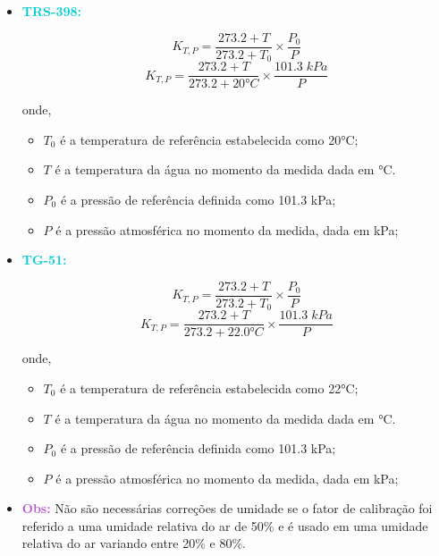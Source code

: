 \documentclass[11pt,a4paper]{article}
\newcounter{exemplo}
\begin{document}
	\begin{exemplo}
		\begin{itemize}
			\item \textcolor{DarkTurquoise}{\Large\LobsterTwo\textbf{TRS-398:}}

				$$K_{T,P} = \frac{273.2 + T}{273.2 + T_0} \times \frac{P_0}{P}$$
				$$K_{T,P} = \frac{273.2 + T}{273.2 + \ang{20}C} \times \frac{101.3\;kPa}{P}$$

			onde,
			\begin{itemize}[label=\textcolor{CarnationPink}{$\star$}]
				\item $T_0$ é a temperatura de referência estabelecida como \ang{20}C;
				\item $T$ é a temperatura da água no momento da medida dada em \unit{\celsius}.
				\item $P_0$ é a pressão de referência definida como 101.3 kPa;
				\item $P$ é a pressão atmosférica no momento da medida, dada em kPa;
			\end{itemize}

			\item \textcolor{DarkTurquoise}{\Large\LobsterTwo\textbf{TG-51:}}
			
				$$K_{T,P} = \frac{273.2 + T}{273.2 + T_0} \times \frac{P_0}{P}$$
				$$K_{T,P} = \frac{273.2 + T}{273.2 + \ang{22.0}C} \times \frac{101.3\;kPa}{P}$$

			onde,
			\begin{itemize}[label=\textcolor{CarnationPink}{$\star$}]
				\item $T_0$ é a temperatura de referência estabelecida como \ang{22}C;
				\item $T$ é a temperatura da água no momento da medida dada em \unit{\celsius}.
				\item $P_0$ é a pressão de referência definida como 101.3 kPa;
				\item $P$ é a pressão atmosférica no momento da medida, dada em kPa;
			\end{itemize}
			\item \textcolor{MediumOrchid}{\textbf{Obs:}} Não são necessárias correções de umidade se o fator de calibração foi referido a uma umidade relativa do ar de 50\% e é usado em uma umidade relativa  do ar variando entre 20\% e 80\%.
		\end{itemize}
	\end{exemplo}
\end{document}
